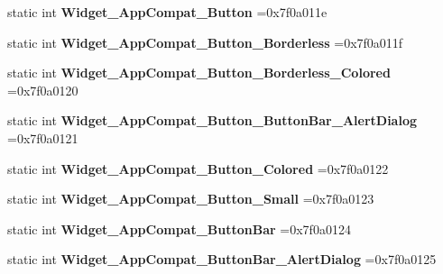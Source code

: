 \begin{DoxyCompactItemize}
static int {\bfseries Widget\+\_\+\+App\+Compat\+\_\+\+Button} =0x7f0a011e
\item 
\mbox{\label{classandroid_1_1support_1_1v7_1_1cardview_1_1R_1_1style_a624145d59f5cd67035cb39939d5366e1}} 
static int {\bfseries Widget\+\_\+\+App\+Compat\+\_\+\+Button\+\_\+\+Borderless} =0x7f0a011f
\item 
\mbox{\label{classandroid_1_1support_1_1v7_1_1cardview_1_1R_1_1style_aa52c38abe8f3b5e3d82aec7b7d98de8f}} 
static int {\bfseries Widget\+\_\+\+App\+Compat\+\_\+\+Button\+\_\+\+Borderless\+\_\+\+Colored} =0x7f0a0120
\item 
\mbox{\label{classandroid_1_1support_1_1v7_1_1cardview_1_1R_1_1style_a6d047e95bea8ef34095e67f764d53fc7}} 
static int {\bfseries Widget\+\_\+\+App\+Compat\+\_\+\+Button\+\_\+\+Button\+Bar\+\_\+\+Alert\+Dialog} =0x7f0a0121
\item 
\mbox{\label{classandroid_1_1support_1_1v7_1_1cardview_1_1R_1_1style_ad9a6410cac093ef80ab27233617e3096}} 
static int {\bfseries Widget\+\_\+\+App\+Compat\+\_\+\+Button\+\_\+\+Colored} =0x7f0a0122
\item 
\mbox{\label{classandroid_1_1support_1_1v7_1_1cardview_1_1R_1_1style_a14e6108f79a7c219e5eff3abfade48c1}} 
static int {\bfseries Widget\+\_\+\+App\+Compat\+\_\+\+Button\+\_\+\+Small} =0x7f0a0123
\item 
\mbox{\label{classandroid_1_1support_1_1v7_1_1cardview_1_1R_1_1style_afd24a096ce9d35ed07b9d4703698f712}} 
static int {\bfseries Widget\+\_\+\+App\+Compat\+\_\+\+Button\+Bar} =0x7f0a0124
\item 
\mbox{\label{classandroid_1_1support_1_1v7_1_1cardview_1_1R_1_1style_a42fd7404d80a3dc9958268940c0a264b}} 
static int {\bfseries Widget\+\_\+\+App\+Compat\+\_\+\+Button\+Bar\+\_\+\+Alert\+Dialog} =0x7f0a0125
\item 
\mbox{\label{classandroid_1_1support_1_1v7_1_1cardview_1_1R_1_1style_a6c753c433f52517a73569f2de17c5303}} 

\end{DoxyCompactItemize}
